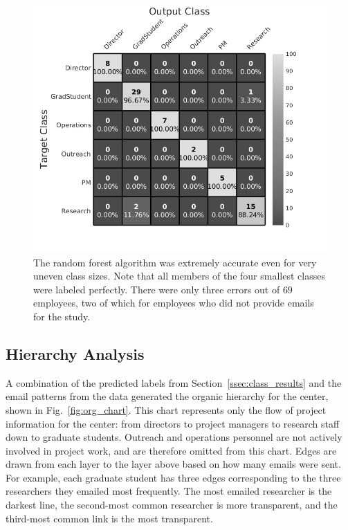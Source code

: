 \documentclass[10pt,twocolumn,conference]{IEEEtran}
\begin{document}
\begin{figure}[t]
    \centering
    \includegraphics[width=0.85\columnwidth,trim={1mm 8mm 10mm 0mm},clip]{Classification_confusion_BW}
    \caption{The random forest algorithm was extremely accurate even for very uneven class sizes.  Note that all members of the four smallest classes were labeled perfectly.  There were only three errors out of $69$ employees, two of which for employees who did not provide emails for the study.}
    \label{fig:result_hist}
\end{figure}


\subsection{Hierarchy Analysis}
A combination of the predicted labels from Section~\ref{ssec:class_results} and the email patterns from the data generated the organic hierarchy for the center, shown in Fig.~\ref{fig:org_chart}.
This chart represents only the flow of project information for the center: from directors to project managers to research staff down to graduate students.
Outreach and operations personnel are not actively involved in project work, and are therefore omitted from this chart.
Edges are drawn from each layer to the layer above based on how many emails were sent.
For example, each graduate student has three edges corresponding to the three researchers they emailed most frequently.
The most emailed researcher is the darkest line, the second-most common researcher is more transparent, and the third-most common link is the most transparent.
\end{document}

